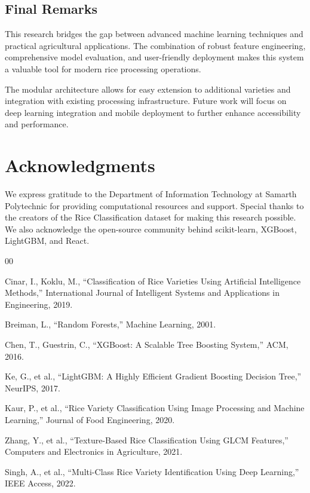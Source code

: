 \documentclass[conference]{IEEEtran}
\begin{document}
\subsection{Final Remarks}

This research bridges the gap between advanced machine learning techniques and practical agricultural applications. The combination of robust feature engineering, comprehensive model evaluation, and user-friendly deployment makes this system a valuable tool for modern rice processing operations.

The modular architecture allows for easy extension to additional varieties and integration with existing processing infrastructure. Future work will focus on deep learning integration and mobile deployment to further enhance accessibility and performance.

\section*{Acknowledgments}

We express gratitude to the Department of Information Technology at Samarth Polytechnic for providing computational resources and support. Special thanks to the creators of the Rice Classification dataset for making this research possible. We also acknowledge the open-source community behind scikit-learn, XGBoost, LightGBM, and React.

\begin{thebibliography}{00}

 Cinar, I., Koklu, M., ``Classification of Rice Varieties Using Artificial Intelligence Methods,'' International Journal of Intelligent Systems and Applications in Engineering, 2019.

 Breiman, L., ``Random Forests,'' Machine Learning, 2001.

 Chen, T., Guestrin, C., ``XGBoost: A Scalable Tree Boosting System,'' ACM, 2016.

 Ke, G., et al., ``LightGBM: A Highly Efficient Gradient Boosting Decision Tree,'' NeurIPS, 2017.

 Kaur, P., et al., ``Rice Variety Classification Using Image Processing and Machine Learning,'' Journal of Food Engineering, 2020.

 Zhang, Y., et al., ``Texture-Based Rice Classification Using GLCM Features,'' Computers and Electronics in Agriculture, 2021.

 Singh, A., et al., ``Multi-Class Rice Variety Identification Using Deep Learning,'' IEEE Access, 2022.

\end{thebibliography}
\end{document}
